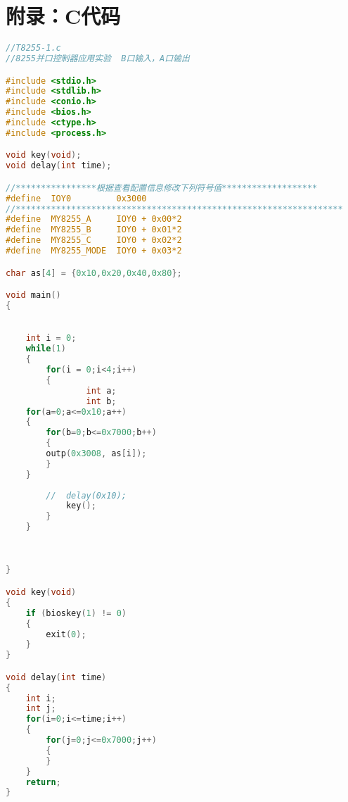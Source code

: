 \newpage
\appendix %

\section{附录：C代码}


\begin{lstlisting}[language={C}]
//T8255-1.c
//8255并口控制器应用实验  B口输入，A口输出

#include <stdio.h>
#include <stdlib.h>
#include <conio.h>
#include <bios.h>
#include <ctype.h>
#include <process.h>

void key(void);
void delay(int time);

//****************根据查看配置信息修改下列符号值*******************
#define  IOY0         0x3000
//*****************************************************************
#define  MY8255_A     IOY0 + 0x00*2
#define  MY8255_B     IOY0 + 0x01*2
#define  MY8255_C     IOY0 + 0x02*2
#define  MY8255_MODE  IOY0 + 0x03*2

char as[4] = {0x10,0x20,0x40,0x80};

void main()
{
	

	int i = 0;
	while(1)
	{
		for(i = 0;i<4;i++)
		{
            	int a;
	            int b;
	for(a=0;a<=0x10;a++)
	{
		for(b=0;b<=0x7000;b++)
		{
		outp(0x3008, as[i]);
		}
	}
			
		//	delay(0x10);
			key();
		}
	}
		
	

}

void key(void)
{
	if (bioskey(1) != 0)
	{
		exit(0);
	}
}

void delay(int time)
{
	int i;
	int j;
	for(i=0;i<=time;i++)
	{
		for(j=0;j<=0x7000;j++)
		{
		}
	}
	return;
}
\end{lstlisting}
